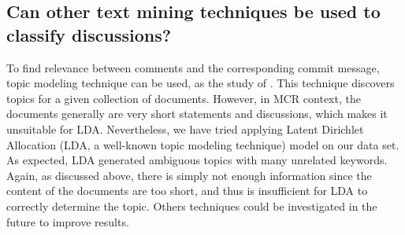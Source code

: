 %
% 
% 
%
%
%

\subsection{Can other text mining techniques be used to classify discussions?}
To find relevance between comments and the corresponding commit message,
topic modeling technique can be used, as the study of \cite{Barua2012a}.
This technique discovers topics for a given collection of documents.
However, in MCR context, the documents generally are very short statements and discussions, which makes it unsuitable for LDA. 
Nevertheless, we have tried applying Latent Dirichlet Allocation (LDA, a well-known topic modeling technique) model on our data set.
As expected, LDA generated ambiguous topics with many unrelated keywords. Again, as discussed above, there is simply not enough information since the content of the documents are too short, and thus is insufficient for LDA to correctly determine the topic. Others techniques could be investigated in the future to improve results.

